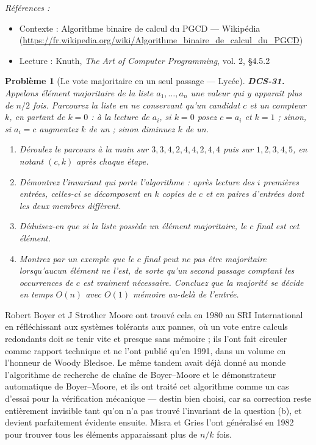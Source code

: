 \documentclass[11pt]{article}
\newtheorem{problem}{Problème}
\newenvironment{refs}{\par\small\noindent\emph{Références :}\begin{itemize}\setlength\itemsep{0pt}}{\end{itemize}\normalsize}
\begin{document}
\begin{refs}
\item Contexte : Algorithme binaire de calcul du PGCD --- Wikipédia (\url{https://fr.wikipedia.org/wiki/Algorithme_binaire_de_calcul_du_PGCD})
\item Lecture : Knuth, \textit{The Art of Computer Programming}, vol. 2, \S{}4.5.2
\end{refs}

\bigskip

\begin{problem}[{Le vote majoritaire en un seul passage --- Lycée}]
\textbf{DCS-31.} Appelons \textit{élément majoritaire} de la liste $a_1, \dots, a_n$ une valeur qui y apparaît plus de $n/2$ fois. Parcourez la liste en ne conservant qu'un candidat $c$ et un compteur $k$, en partant de $k = 0$ : à la lecture de $a_i$, si $k = 0$ posez $c = a_i$ et $k = 1$ ; sinon, si $a_i = c$ augmentez $k$ de un ; sinon diminuez $k$ de un.
\begin{enumerate}
\item[(a)] Déroulez le parcours à la main sur $3,3,4,2,4,4,2,4,4$ puis sur $1,2,3,4,5$, en notant $(c,k)$ après chaque étape.
\item[(b)] Démontrez l'invariant qui porte l'algorithme : après lecture des $i$ premières entrées, celles-ci se décomposent en $k$ copies de $c$ et en paires d'entrées dont les deux membres diffèrent.
\item[(c)] Déduisez-en que si la liste possède un élément majoritaire, le $c$ final est cet élément.
\item[(d)] Montrez par un exemple que le $c$ final peut ne pas être majoritaire lorsqu'aucun élément ne l'est, de sorte qu'un second passage comptant les occurrences de $c$ est vraiment nécessaire. Concluez que la majorité se décide en temps $O(n)$ avec $O(1)$ mémoire au-delà de l'entrée.
\end{enumerate}

\end{problem}

\noindent Robert Boyer et J Strother Moore ont trouvé cela en 1980 au SRI International en réfléchissant aux systèmes tolérants aux pannes, où un \og{} vote \fg{} entre calculs redondants doit se tenir vite et presque sans mémoire ; ils l'ont fait circuler comme rapport technique et ne l'ont publié qu'en 1991, dans un volume en l'honneur de Woody Bledsoe. Le même tandem avait déjà donné au monde l'algorithme de recherche de chaîne de Boyer--Moore et le démonstrateur automatique de Boyer--Moore, et ils ont traité cet algorithme comme un cas d'essai pour la vérification mécanique --- destin bien choisi, car sa correction reste entièrement invisible tant qu'on n'a pas trouvé l'invariant de la question (b), et devient parfaitement évidente ensuite. Misra et Gries l'ont généralisé en 1982 pour trouver tous les éléments apparaissant plus de $n/k$ fois.
\end{document}
